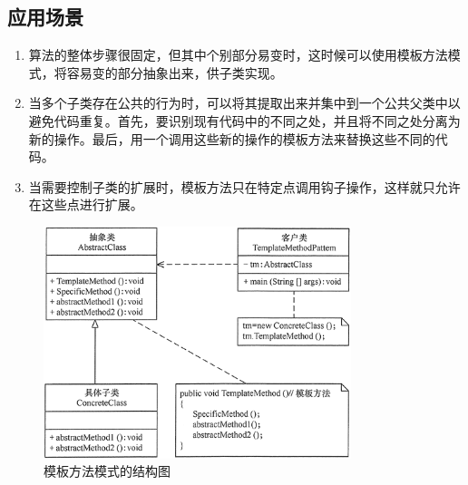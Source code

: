 \subsection{应用场景}
\begin{enumerate}
	\item 算法的整体步骤很固定，但其中个别部分易变时，这时候可以使用模板方法模式，将容易变的部分抽象出来，供子类实现。
	\item 当多个子类存在公共的行为时，可以将其提取出来并集中到一个公共父类中以避免代码重复。首先，要识别现有代码中的不同之处，并且将不同之处分离为新的操作。最后，用一个调用这些新的操作的模板方法来替换这些不同的代码。
	\item 当需要控制子类的扩展时，模板方法只在特定点调用钩子操作，这样就只允许在这些点进行扩展。
\end{enumerate}
\begin{figure}[!h]
	\centering
	\includegraphics[width=0.8\textwidth]{image/3-1}
	\caption{模板方法模式的结构图}
\end{figure}

